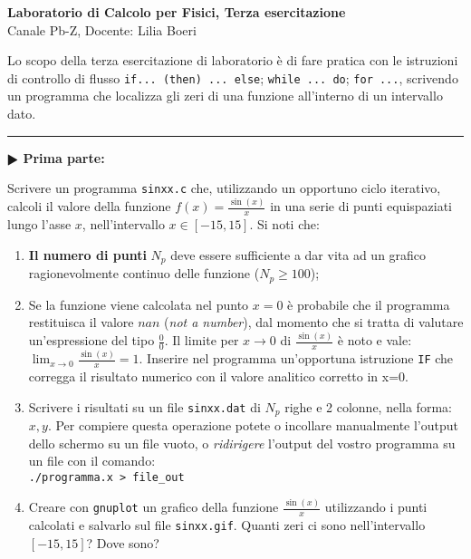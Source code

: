 \documentclass[11pt]{article}
\begin{document}
\pagestyle{empty}

\begin{center}
{\Large \bf  Laboratorio di Calcolo per Fisici, Terza esercitazione\\[2mm]}
{\large Canale Pb-Z, Docente: Lilia Boeri}
\end{center}
\vspace{4mm}

\begin{mdframed}[backgroundcolor=gray!10]
  Lo scopo della terza esercitazione di laboratorio \`e di fare pratica con
le istruzioni di controllo di flusso \texttt{if... (then) ... else}; \texttt{while ... do};
\texttt{for ...}, scrivendo un programma che localizza gli zeri di una funzione
all'interno di un intervallo dato.
  \end{mdframed}
%
%



\hrule
\vspace{2mm}
\textbf{$\RHD$ Prima parte:}

Scrivere un programma \texttt{sinxx.c} che, utilizzando un opportuno ciclo iterativo,
calcoli il valore della funzione $f(x)=\frac{\sin(x)}{x}$ in una serie di
punti equispaziati lungo l'asse $x$, nell'intervallo $x \in \left[-15,15 \right]$.
Si noti che:
\begin{enumerate}
\item  {\bf Il numero di punti} $N_{p}$ deve essere sufficiente a dar vita ad un grafico ragionevolmente continuo delle funzione ($N_p \ge 100$);
\item Se la funzione viene calcolata nel punto $x=0$ \`e probabile che il programma restituisca il valore $nan$ (\emph{not a number}), 
dal momento che si 
tratta di valutare un'espressione del tipo $\frac{0}{0}$. Il limite per $x \to 0$ di 
$\frac{\sin(x)}{x}$ \`e noto e vale: $\lim_{x \to 0} \frac{\sin(x)}{x} = 1$.
 Inserire nel programma un'opportuna  istruzione \texttt{IF} che corregga il risultato numerico con il valore analitico corretto in x=0.
\item Scrivere i risultati su un file \texttt{sinxx.dat} di $N_p$ righe e 2 colonne, nella forma: $x,y$. Per compiere questa operazione potete o incollare manualmente l'output dello schermo su un file vuoto, o {\em ridirigere} l'output
del vostro programma su un file con il comando:
\\
\texttt{./programma.x > file\_out}

\item Creare con \texttt{gnuplot} un grafico della funzione $\frac{\sin(x)}{x}$
utilizzando i punti calcolati e salvarlo sul file \texttt{sinxx.gif}. 
 Quanti zeri ci sono nell'intervallo $\left[ -15,15 \right]$? Dove sono?
\end{enumerate}
\end{document}
